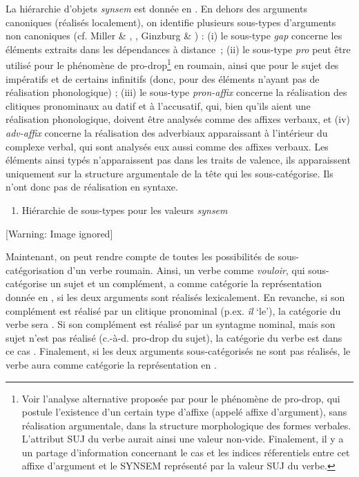 La hiérarchie d'objets \textit{synsem} est donnée en . En dehors des arguments canoniques (réalisés localement), on identifie plusieurs sous-types d'arguments non canoniques (cf. Miller \& \citet{Sag1997}, \citet{Monachesi1999}, Ginzburg \& \citet{Sag2000}) : (i) le sous-type \textit{gap} concerne les éléments extraits dans les dépendances à distance\textit{~}; (ii) le sous-type \textit{pro} peut être utilisé pour le phénomène de pro-drop\footnote{Voir l'analyse alternative proposée par \citet{Ionescu1999} pour le phénomène de pro-drop, qui postule l'existence d'un certain type d'affixe (appelé affixe d'argument), sans réalisation argumentale, dans la structure morphologique des formes verbales. L'attribut SUJ du verbe aurait ainsi une valeur non-vide. Finalement, il y a un partage d'information concernant le cas et les indices réferentiels entre cet affixe d'argument et le SYNSEM représenté par la valeur SUJ du verbe.}  en roumain, ainsi que pour le sujet des impératifs et de certains infinitifs (donc, pour des éléments n'ayant pas de réalisation phonologique) ; (iii) le sous-type \textit{pron-affix} concerne la réalisation des clitiques pronominaux au datif et à l'accusatif, qui, bien qu'ils aient une réalisation phonologique, doivent être analysés comme des affixes verbaux, et (iv) \textit{adv-affix} concerne la réalisation des adverbiaux apparaissant à l'intérieur du complexe verbal, qui sont analysés eux aussi comme des affixes verbaux. Les éléments ainsi typés n'apparaissent pas dans les traits de valence, ils apparaissent uniquement sur la structure argumentale de la tête qui les sous-catégorise. Ils n'ont donc pas de réalisation en syntaxe. 


\begin{enumerate}
\item \label{bkm:Ref299374044}Hiérarchie de sous-types pour les valeurs \textit{synsem}


\end{enumerate}
{   [Warning: Image ignored] %
} 

Maintenant, on peut rendre compte de toutes les possibilités de sous-catégorisation d'un verbe roumain. Ainsi, un verbe comme \textit{vouloir}, qui sous-catégorise un sujet et un complément, a comme catégorie la représentation donnée en , si les deux arguments sont réalisés lexicalement. En revanche, si son complément est réalisé par un clitique pronominal (p.ex. \textit{îl} `le'), la catégorie du verbe sera . Si son complément est réalisé par un syntagme nominal, mais son sujet n'est pas réalisé (c.-à-d. pro-drop du sujet), la catégorie du verbe est dans ce cas . Finalement, si les deux arguments sous-catégorisés ne sont pas réalisés, le verbe aura comme catégorie la représentation en .  


